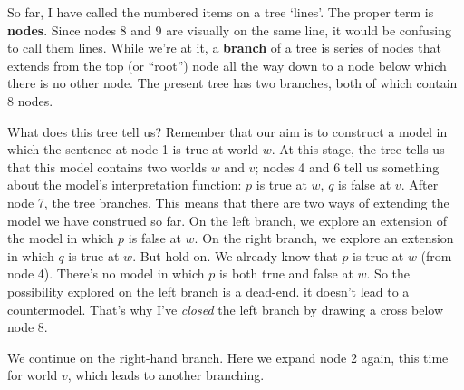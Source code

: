 \begin{center}
\end{center}

So far, I have called the numbered items on a tree `lines'. The proper term is
\textbf{nodes}. Since nodes 8 and 9 are visually on the same line, it would be
confusing to call them lines. While we're at it, a \textbf{branch} of a tree is
series of nodes that extends from the top (or ``root'') node all the way down to
a node below which there is no other node. The present tree has two branches,
both of which contain 8 nodes.

What does this tree tell us? Remember that our aim is to construct a model in
which the sentence at node 1 is true at world $w$. At this stage, the tree tells
us that this model contains two worlds $w$ and $v$; nodes 4 and 6 tell us
something about the model's interpretation function: $p$ is true at $w$, $q$ is
false at $v$. After node 7, the tree branches. This means that there are two
ways of extending the model we have construed so far. On the left branch, we
explore an extension of the model in which $p$ is false at $w$. On the right
branch, we explore an extension in which $q$ is true at $w$. But hold on. We
already know that $p$ is true at $w$ (from node 4). There's no model in which
$p$ is both true and false at $w$. So the possibility explored on the left
branch is a dead-end. it doesn't lead to a countermodel. That's why I've
\emph{closed} the left branch by drawing a cross below node 8.

We continue on the right-hand branch. Here we expand node 2 again, this time for
world $v$, which leads to another branching.

